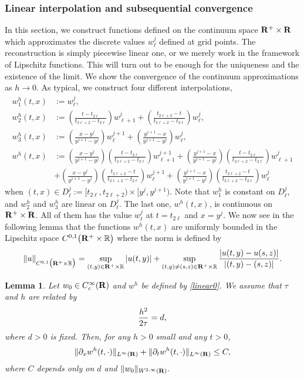 \documentclass[11pt]{amsart}
\def\R{{\bf R}}
\def\R{\mathbb{R}}
\def\R{{\bf R}}
\newtheorem{lemma}{Lemma}[section]
\begin{document}
\subsubsection{Linear interpolation and subsequential convergence}
In this section, we construct functions defined on the continuum space $\R^+\times\R$ which approximates the discrete values $w^j_\ell$ defined at grid points. The reconstruction is simply piecewise linear one, or we merely work in the framework of Lipschitz functions. This will turn out to be enough for the uniqueness and the existence of the limit. We show the convergence of the continuum approximations as $h\to0$. As typical, we construct four different interpolations,
\begin{equation} \label{linear0}
\begin{aligned}
 w_1^h(t,x)&:= w^j_\ell,\\
 w_2^h(t,x)&:= \left(\tfrac{t-t_{2\ell}}{t_{2\ell+2}-t_{2\ell}} \right)
 w_{\ell+1}^{j} + \left(\tfrac{t_{2\ell+2}-t}{t_{2\ell+2}-t_{2\ell}} \right)
 w_{\ell}^{j},\\
 w_3^h(t,x)&:= \left(\tfrac{x-y^j}{y^{j+1}-y^j} \right) w_{\ell}^{j+1}
 + \left(\tfrac{y^{j+1}-x}{y^{j+1}-y^j} \right) w_{\ell}^{j},\\
  w^h(t,x)&:= \left(\tfrac{x-y^j}{y^{j+1}-y^j}
  \right)\left(\tfrac{t-t_{2\ell}}{t_{2\ell+2}-t_{2\ell}} \right)
  w_{\ell+1}^{j+1} + \left(\tfrac{y^{j+1}-x}{y^{j+1}-y^j}
  \right)\left(\tfrac{t-t_{2\ell}}{t_{2\ell+2}-t_{2\ell}} \right)
  w_{\ell+1}^{j}\\
 &+ \left(\tfrac{x-y^j}{y^{j+1}-y^j}
 \right)\left(\tfrac{t_{2\ell+2}-t}{t_{2\ell+2}-t_{2\ell}} \right)
 w_{\ell}^{j+1} + \left(\tfrac{y^{j+1}-x}{y^{j+1}-y^j}
 \right)\left(\tfrac{t_{2\ell+2}-t}{t_{2\ell+2}-t_{2\ell}} \right)
 w_{\ell}^{j}
  \end{aligned}
\end{equation}
when $(t,x)\in D_\ell^j:=[t_{2\ell}, t _{2\ell+2}) \times [y^j, y^{j+1})$. Note that $w_1^h$ is constant on $D_\ell^j$, and $w_2^h$ and $w_3^h$ are linear on $D_\ell^j$. The last one, $w^h(t,x)$, is continuous on $\R^+\times\R$. All of them has the value $w^j_\ell$ at $t=t_{2\ell}$ and $x=y^j$. We now see in the following lemma that the functions $w^h(t,x)$ are uniformly bounded in the Lipschitz space $C^{0,1}\big(\R^+\times \mathbb{R}\big)$ where the norm is defined by
$$\|u\|_{C^{0,1}\big(\R^+\times \mathbb{R}\big)} = \sup_{(t,y)\in \R^+\times \mathbb{R}}|u(t,y)| + \sup_{(t,y)\ne(s,z) \in \R^+\times \mathbb{R}} \frac{|u(t,y)-u(s,z)|}{|(t,y)-(s,z)|}.$$
\begin{lemma} \label{misc}
Let $w_0\in C^{\infty}_c(\R)$ and $w^h$ be defined by \eqref{linear0}. We assume that $\tau$ and $h$ are related by
$$
{h^2\over 2\tau}=d,
$$
where $d>0$ is fixed. Then, for any $h>0$ small and any $t>0$, 
$$\|\partial_x w^h(t,\cdot)\|_{L^\infty(\R)} + \|\partial_t w^h(t,\cdot)\|_{L^\infty(\R)} \le C,$$
where $C$ depends only on $d$ and $\|w_0\|_{W^{2,\infty}(\R)}.$
\end{lemma}
\end{document}
